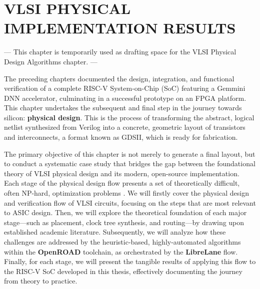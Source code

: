 
\chapter{VLSI PHYSICAL IMPLEMENTATION RESULTS}
\label{chap:openroad_librelane}

---
This chapter is temporarily used as drafting space for the VLSI Physical Design Algorithms chapter.
---





The preceding chapters documented the design, integration, and functional verification of a complete RISC-V System-on-Chip (SoC) featuring a Gemmini DNN accelerator, culminating in a successful prototype on an FPGA platform. This chapter undertakes the subsequent and final step in the journey towards silicon: \textbf{physical design}. This is the process of transforming the abstract, logical netlist synthesized from Verilog into a concrete, geometric layout of transistors and interconnects, a format known as GDSII, which is ready for fabrication.

The primary objective of this chapter is not merely to generate a final layout, but to conduct a systematic case study that bridges the gap between the foundational theory of VLSI physical design and its modern, open-source implementation. Each stage of the physical design flow presents a set of theoretically difficult, often NP-hard, optimization problems \cite{vlsi-springer}. We will firstly cover the physical design and verification flow of VLSI circuits, focusing on the steps that are most relevant to ASIC design. Then, we will explore the theoretical foundation of each major stage—such as placement, clock tree synthesis, and routing—by drawing upon established academic literature. Subsequently, we will analyze how these challenges are addressed by the heuristic-based, highly-automated algorithms within the \textbf{OpenROAD} toolchain, as orchestrated by the \textbf{LibreLane} flow. Finally, for each stage, we will present the tangible results of applying this flow to the RISC-V SoC developed in this thesis, effectively documenting the journey from theory to practice.

